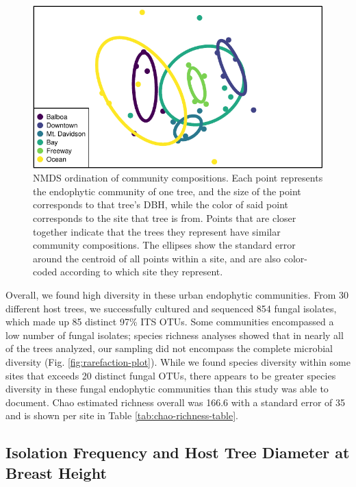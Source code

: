 \documentclass[fleqn,10pt,lineno]{wlpeerj} %
\begin{document}
\begin{figure}
\centering
\includegraphics{gibson2023_files/figure-latex/nmds-plot-1.pdf}
\caption{\label{fig:nmds-plot}NMDS ordination of community compositions. Each point represents the endophytic community of one tree, and the size of the point corresponds to that tree's DBH, while the color of said point corresponds to the site that tree is from. Points that are closer together indicate that the trees they represent have similar community compositions. The ellipses show the standard error around the centroid of all points within a site, and are also color-coded according to which site they represent.}
\end{figure}

Overall, we found high diversity in these urban endophytic communities. From 30 different host trees, we successfully cultured and sequenced 854 fungal isolates, which made up 85 distinct 97\% ITS OTUs. Some communities encompassed a low number of fungal isolates; species richness analyses showed that in nearly all of the trees analyzed, our sampling did not encompass the complete microbial diversity (Fig. \ref{fig:rarefaction-plot}). While we found species diversity within some sites that exceeds 20 distinct fungal OTUs, there appears to be greater species diversity in these fungal endophytic communities than this study was able to document. Chao estimated richness overall was 166.6 with a standard error of 35 and is shown per site in Table \ref{tab:chao-richness-table}.

\hypertarget{isolation-frequency-and-host-tree-diameter-at-breast-height}{%
\subsection*{Isolation Frequency and Host Tree Diameter at Breast Height}\label{isolation-frequency-and-host-tree-diameter-at-breast-height}}
\end{document}
